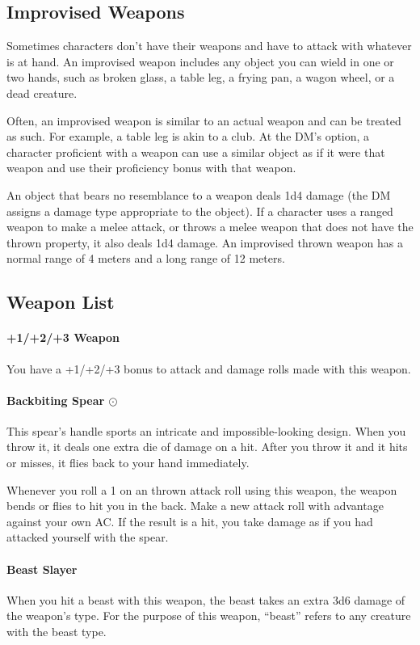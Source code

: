 \subsection*{Improvised Weapons} \label{ssec::improvisedweapons}
    Sometimes characters don't have their weapons and have to attack with whatever is at hand.
    An improvised weapon includes any object you can wield in one or two hands, such as broken glass, a table leg, a frying pan, a wagon wheel, or a dead creature.

    Often, an improvised weapon is similar to an actual weapon and can be treated as such.
    For example, a table leg is akin to a club.
    At the DM's option, a character proficient with a weapon can use a similar object as if it were that weapon and use their proficiency bonus with that weapon.

    An object that bears no resemblance to a weapon deals 1d4 damage (the DM assigns a damage type appropriate to the object).
    If a character uses a ranged weapon to make a melee attack, or throws a melee weapon that does not have the thrown property, it also deals 1d4 damage.
    An improvised thrown weapon has a normal range of 4 meters and a long range of 12 meters.
\subsection*{Weapon List} \label{ssec::weaponlist}
    \paragraph{+1/+2/+3 Weapon}
        You have a +1/+2/+3 bonus to attack and damage rolls made with this weapon.
    \paragraph{Backbiting Spear $\odot$}
        This spear's handle sports an intricate and impossible-looking design.
        When you throw it, it deals one extra die of damage on a hit.
        After you throw it and it hits or misses, it flies back to your hand immediately.

        Whenever you roll a 1 on an thrown attack roll using this weapon, the weapon bends or flies to hit you in the back.
        Make a new attack roll with advantage against your own AC.
        If the result is a hit, you take damage as if you had attacked yourself with the spear.
    \paragraph{Beast Slayer}
        When you hit a beast with this weapon, the beast takes an extra 3d6 damage of the weapon's type.
        For the purpose of this weapon, ``beast'' refers to any creature with the beast type.
